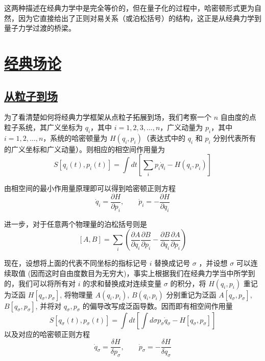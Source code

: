 这两种描述在经典力学中是完全等价的，但在量子化的过程中，哈密顿形式更为自然，因为它直接给出了正则对易关系（或泊松括号）的结构，这正是从经典力学到量子力学过渡的桥梁。




\section{\protect\hyperlink{:}{经典场论}}


\subsection{\protect\hyperlink{:}{从粒子到场}}
为了看清楚如何将经典力学框架从点粒子拓展到场，我们考察一个 $n$ 自由度的点粒子系统，其广义坐标为 $q_i$，其中 $i = 1, 2, 3, \ldots, n$，广义动量为 $p_i$，其中 $i = 1, 2, \ldots, n$，系统的哈密顿量为 $H(q_i, p_i)$（表达式中的 $q_i$ 和 $p_i$ 分别代表所有的广义坐标和广义动量）。则相应的相空间作用量为
\begin{equation}
    S[q_i(t),p_i(t)] = \int dt \left[\sum_i p_i \dot{q}_i - H(q_i,p_i)\right]
\end{equation}

由相空间的最小作用量原理即可以得到哈密顿正则方程
\begin{equation}
    \dot{q}_i = \frac{\partial H}{\partial p_i},\qquad \dot{p}_i = -\frac{\partial H}{\partial q_i}
\end{equation}

进一步，对于任意两个物理量的泊松括号则是
\begin{equation}
    \left[A,B\right] = \sum_i \left(\frac{\partial A}{\partial q_i}\frac{\partial B}{\partial p_i} - \frac{\partial B}{\partial q_i}\frac{\partial A}{\partial p_i} \right)
\end{equation}

现在，设想将上面的代表不同坐标的指标记号 $i$ 替换成记号 $\sigma$ ，并设想 $\sigma$ 可以连续取值 (因而这时自由度数目为无穷大)，事实上根据我们在经典力学当中所学到的，我们可以将所有对 $i$ 的求和替换成对连续变量
$\sigma$ 的积分，将 $H(q_i, p_i)$ 重记为泛函 $H[q_\sigma,p_\sigma]$, 将物理量 $A(q_i, p_i)$, $B(q_i, p_i)$ 分别重记为泛函 $A[q_\sigma,p_\sigma]$,$B[q_\sigma,p_\sigma]$, 并将对 $q_\sigma,p_\sigma$ 的偏导改写成泛函导数。因而即有相空间作用量
\begin{equation}
    S[q_\sigma(t),p_\sigma(t)] = \int dt \left[\int d\sigma p_\sigma \dot{q}_\sigma - H[q_\sigma,p_\sigma]\right]
\end{equation}
以及对应的哈密顿正则方程
\begin{equation}
    \dot{q}_\sigma = \frac{\delta H}{\delta p_\sigma},\qquad \dot{p}_\sigma = -\frac{\delta H}{\delta q_\sigma}
\end{equation}

